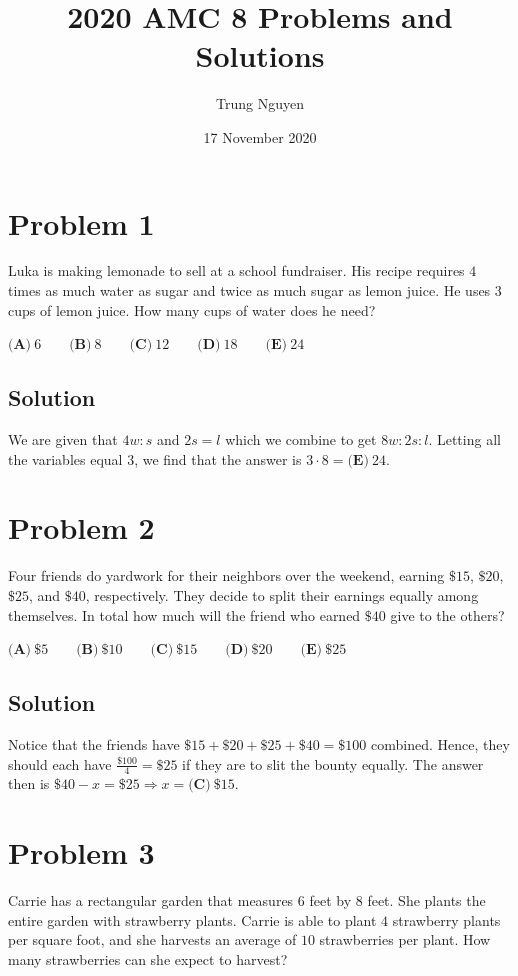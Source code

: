 \documentclass{article}
\title{2020 AMC 8 Problems and Solutions}
\author{Trung Nguyen}
\date{17 November 2020}
\begin{document}
\maketitle

\section{Problem 1}
Luka is making lemonade to sell at a school fundraiser. His recipe requires $4$ times as much water as sugar and twice as much sugar as lemon juice. He uses $3$ cups of lemon juice. How many cups of water does he need?

$\textbf{(A)}\ 6 \qquad \textbf{(B)}\ 8 \qquad \textbf{(C)}\ 12\qquad \textbf{(D)}\ 18 \qquad \textbf{(E)}\ 24$
\subsection{Solution}
We are given that $4w:s$ and $2s=l$ which we combine to get $8w:2s:l$. Letting all the variables equal $3$, we find that the answer is $3\cdot 8=\textbf{(E)}\ 24$.

\section{Problem 2}
Four friends do yardwork for their neighbors over the weekend, earning $\$15$, $\$20$, $\$25$, and $\$40$, respectively. They decide to split their earnings equally among themselves. In total how much will the friend who earned $\$40$ give to the others?

$\textbf{(A)}\ \$5 \qquad \textbf{(B)}\ \$10 \qquad \textbf{(C)}\ \$15\qquad \textbf{(D)}\ \$20 \qquad \textbf{(E)}\ \$25$
\subsection{Solution}
Notice that the friends have $\$15+\$20+\$25+\$40=\$100$ combined. Hence, they should each have $\frac{\$100}{4}=\$25$ if they are to slit the bounty equally. The answer then is $\$40-x=\$25 \Rightarrow x=\textbf{(C)}\ \$15 $. 

\section{Problem 3}
Carrie has a rectangular garden that measures $6$ feet by $8$ feet. She plants the entire garden with strawberry plants. Carrie is able to plant $4$ strawberry plants per square foot, and she harvests an average of $10$ strawberries per plant. How many strawberries can she expect to harvest?
\end{document}
